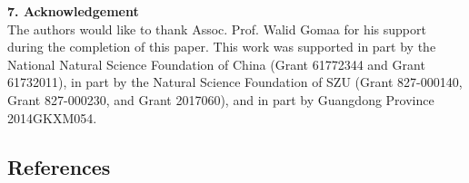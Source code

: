 \documentclass{article}
\begin{document}
		\textbf{7. Acknowledgement}\\
		
		The authors would like to thank Assoc. Prof. Walid Gomaa for his support during the completion of
		this paper. This work was supported in part by the National Natural Science Foundation of China (Grant
		61772344 and Grant 61732011), in part by the Natural Science Foundation of SZU (Grant 827-000140, Grant
		827-000230, and Grant 2017060), and in part by Guangdong Province 2014GKXM054.
		\vspace{0.7em}




		
		\begin{center}
			\section*{References}
		\end{center}
		

		
		
		
		

		
		
	
\end{document}
